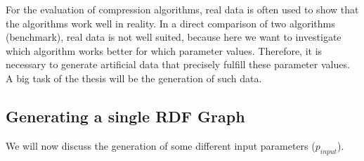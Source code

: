 \documentclass[a4paper]{scrartcl}
\begin{document}
For the evaluation of compression algorithms, real data is often used to show that the algorithms work well in reality. In a direct comparison of two algorithms (benchmark), real data is not well suited, because here we want to investigate which algorithm works better for which parameter values. Therefore, it is necessary to generate artificial data that precisely fulfill these parameter values. A big task of the thesis will be the generation of such data.

\subsection*{Generating a single RDF Graph}

We will now discuss the generation of some different input parameters ($ p_{input} $). 
\end{document}
